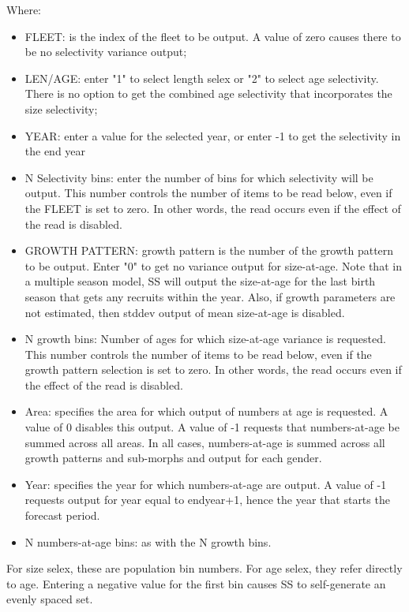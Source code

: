 Where:
\begin{itemize}
	\item FLEET:  is the index of the fleet to be output.  A value of zero causes there to be no selectivity variance output;
	\item LEN/AGE:  enter "1" to select length selex or "2" to select age selectivity.  There is no option to get the combined age selectivity that incorporates the size selectivity;
	\item YEAR:  enter a value for the selected year, or enter -1 to get the selectivity in the end year
	\item 	N Selectivity bins:  enter the number of bins for which selectivity will be output.  This number controls the number of items to be read below, even if the FLEET is set to zero.  In other words, the read occurs even if the effect of the read is disabled.
	\item GROWTH PATTERN:  growth pattern is the number of the growth pattern to be output.  Enter "0" to get no variance output for size-at-age.   Note that in a multiple season model, SS will output the size-at-age for the last birth season that gets any recruits within the year.  Also, if growth parameters are not estimated, then stddev output of mean size-at-age is disabled.
	\item 	N growth bins:  Number of ages for which size-at-age variance is requested.  This number controls the number of items to be read below, even if the growth pattern selection is set to zero.   In other words, the read occurs even if the effect of the read is disabled.
	\item 	Area:  specifies the area for which output of numbers at age is requested.  A value of 0 disables this output.  A value of -1 requests that numbers-at-age be summed across all areas.  In all cases, numbers-at-age is summed across all growth patterns and sub-morphs and output for each gender.
	\item 	Year:  specifies the year for which numbers-at-age are output.  A value of -1 requests output for year equal to endyear+1, hence the year that starts the forecast period.
	\item N numbers-at-age bins:  as with the N growth bins.
\end{itemize}
For size selex, these are population bin numbers.  For age selex, they refer directly to age.  Entering a negative value for the first bin causes SS to self-generate an evenly spaced set.

